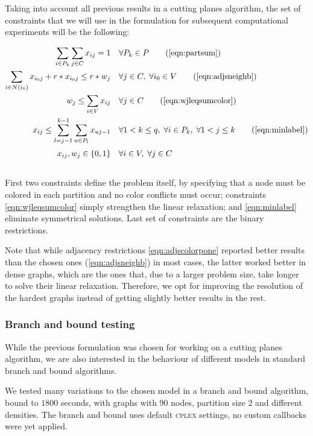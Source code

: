 Taking into account all previous results in a cutting planes algorithm, the set of constraints that we will use in the \PCP{} formulation for subsequent computational experiments will be the following:

\begin{align}
\sum_{i \in P_k} \sum_{j \in C} x_{ij} = 1 \quad &\forall P_k \in P \tag{\ref{eqn:partsum}} \\
 \sum_{i \in N(i_0)} x_{i_0j} + r * x_{i_0j} \leq r * w_j \quad &\forall j \in C, \; \forall i_0 \in V \tag{\ref{eqn:adjsneighb}} \\
 w_j \leq \sum_{i \in V} x_{ij} \quad &\forall j \in C \tag{\ref{eqn:wjleqsumcolor}} \\
 x_{ij} \leq \sum_{l = j-1}^{k-1} \sum_{u \in P_l} x_{uj-1} \quad &\forall 1 < k \leq q, \; \forall i \in P_k, \; \forall 1 < j \leq k \tag{\ref{eqn:minlabel}} \\
  x_{ij}, w_{j} \in \{0,1\} \quad &\forall i \in V, \; \forall j \in C \sumheight \nonumber
\end{align}

First two constraints define the problem itself, by specifying that a node must be colored in each partition and no color conflicts must occur; constraints \ref{eqn:wjleqsumcolor} simply strengthen the linear relaxation; and \ref{eqn:minlabel} eliminate symmetrical solutions. Last set of constraints are the binary restrictions.

Note that while adjacency restrictions \ref{eqn:adjscolorpone} reported better results than the chosen ones (\ref{eqn:adjsneighb}) in most cases, the latter worked better in dense graphs, which are the ones that, due to a larger problem size, take longer to solve their linear relaxation. Therefore, we opt for improving the resolution of the hardest graphs instead of getting slightly better results in the rest. 

\subsubsection{Branch and bound testing}

While the previous formulation was chosen for working on a cutting planes algorithm, we are also interested in the behaviour of different models in standard branch and bound algorithms. 

We tested many variations to the chosen model in a branch and bound algorithm, bound to $1800$ seconds, with graphs with $90$ nodes, partition size $2$ and different densities. The branch and bound uses default \textsc{cplex} settings, no custom callbacks were yet applied.

